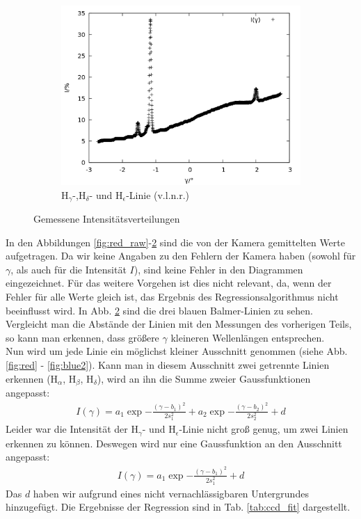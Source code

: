 \begin{figure}[h]
\begin{subfigure}[c]{0.49\linewidth}
  	\includegraphics[width=1\linewidth]{data/Balmer/out_blue_raw.png}
  	\caption{H$_\gamma$-,H$_\delta$- und H$_\epsilon$-Linie (v.l.n.r.)}
  	\label{fig:blue_raw}
  \end{subfigure}
  \caption{Gemessene Intensitätsverteilungen}
\end{figure}

In den Abbildungen \ref{fig:red_raw}-\ref{fig:blue_raw} sind die von der Kamera gemittelten Werte aufgetragen. Da wir keine Angaben zu den Fehlern der Kamera haben (sowohl für $\gamma$, als auch für die Intensität $I$), sind keine Fehler in den Diagrammen eingezeichnet. Für das weitere Vorgehen ist dies nicht relevant, da, wenn der Fehler für alle Werte gleich ist, das Ergebnis des Regressionsalgorithmus nicht beeinflusst wird. In Abb. \ref{fig:blue_raw} sind die drei blauen Balmer-Linien zu sehen. Vergleicht man die Abstände der Linien mit den Messungen des vorherigen Teils, so kann man erkennen, dass größere $\gamma$ kleineren Wellenlängen entsprechen.\\

Nun wird um jede Linie ein möglichst kleiner Ausschnitt genommen (siehe Abb. \ref{fig:red} - \ref{fig:blue2}). Kann man in diesem Ausschnitt zwei getrennte Linien erkennen (H$_\alpha$, H$_\beta$, H$_\delta$), wird an ihn die Summe zweier Gaussfunktionen angepasst:
\begin{align*}
I(\gamma) = a_1\exp{-\frac{(\gamma-b_1)^2}{2s_1^2}} + a_2\exp{-\frac{(\gamma-b_2)^2}{2s_2^2}} + d
\end{align*}
Leider war die Intensität der H$_\gamma$- und H$_\epsilon$-Linie nicht groß genug, um zwei Linien erkennen zu können. Deswegen wird nur eine Gaussfunktion an den Ausschnitt angepasst:
\begin{align*}
I(\gamma) = a_1\exp{-\frac{(\gamma-b_1)^2}{2s_1^2}} + d
\end{align*}
Das $d$ haben wir aufgrund eines nicht vernachlässigbaren Untergrundes hinzugefügt. Die Ergebnisse der Regression sind in Tab. \ref{tab:ccd_fit} dargestellt.

